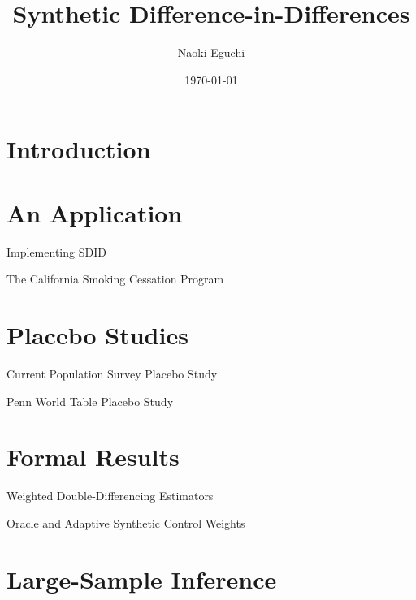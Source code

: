 \documentclass[xcolor=svgnames,aspectratio=169]{beamer}
\begin{document}
\title{Synthetic Difference-in-Differences}
\author{Naoki Eguchi}          
\date{\today}

\begin{frame}
    \titlepage                     
\end{frame}

\section{Introduction}

\section{An Application}

\begin{frame}{Implementing SDID}
\end{frame}

\begin{frame}{The California Smoking Cessation Program}
\end{frame}

\section{Placebo Studies}

\begin{frame}{Current Population Survey Placebo Study}
\end{frame}

\begin{frame}{Penn World Table Placebo Study}
\end{frame}

\section{Formal Results}

\begin{frame}{Weighted Double-Differencing Estimators}
\end{frame}

\begin{frame}{Oracle and Adaptive Synthetic Control Weights}
\end{frame}

\section{Large-Sample Inference}
\end{document}
